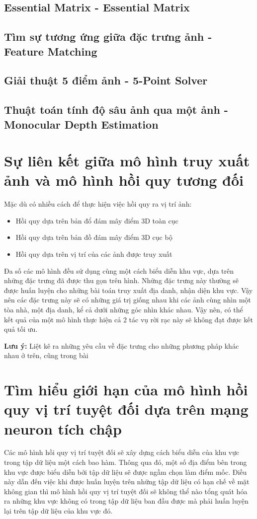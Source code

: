 \subsection{Essential Matrix - Essential Matrix}
\subsection{Tìm sự tương ứng giữa đặc trưng ảnh - Feature Matching}
\subsection{Giải thuật 5 điểm ảnh - 5-Point Solver}
\subsection{Thuật toán tính độ sâu ảnh qua một ảnh - Monocular Depth Estimation}
\section{Sự liên kết giữa mô hình truy xuất ảnh và mô hình hồi quy tương đối}
Mặc dù có nhiều cách để thực hiện việc hồi quy ra vị trí ảnh:
\begin{itemize}
  \item Hồi quy dựa trên bản đổ đám mây điểm 3D toàn cục
  \item Hồi quy dựa trên bản đồ đám mây điểm 3D cục bộ
  \item Hồi quy dựa trên vị trí của các ảnh được truy xuất
\end{itemize}
Đa số các mô hình đều sử dụng cùng một cách biểu diễn khu vực, dựa trên những đặc trưng đã được thu gọn trên hình. Những đặc trưng này thường sẽ được huấn luyện cho những bài toán truy xuất địa danh, nhận diện khu vực. Vậy nên các đặc trưng này sẽ có những giá trị giống nhau khi các ảnh cùng nhìn một tòa nhà, một địa danh, kể cả dưới những góc nhìn khác nhau. Vậy nên, có thể kết quả của một mô hình thực hiện cả 2 tác vụ rời rạc này sẽ không đạt được kết quả tối ưu.\cite{pion2020benchmarking}

\textbf{Lưu ý:} Liệt kê ra những yêu cầu về đặc trưng cho những phương pháp khác nhau ở trên, cũng trong bài \cite{pion2020benchmarking}
\section{Tìm hiểu giới hạn của mô hình hồi quy vị trí tuyệt đối dựa trên mạng neuron tích chập}
Các mô hình hồi quy vị trí tuyệt đối sẽ xây dựng cách biểu diễn của khu vực trong tập dữ liệu một cách bao hàm. Thông qua đó, một số địa điểm bên trong khu vực được biểu diễn bởi tập dữ liệu sẽ được ngầm chọn làm điểm mốc. Điều này dẫn đến việc khi được huấn luyện trên những tập dữ liệu có hạn chế về mặt không gian thì mô hình hồi quy vị trí tuyệt đối sẽ không thể nào tổng quát hóa ra những khu vực không có trong tập dữ liệu ban đầu được mà phải huấn luyện lại trên tập dữ liệu của khu vực đó.\cite{sattler2019understanding}

